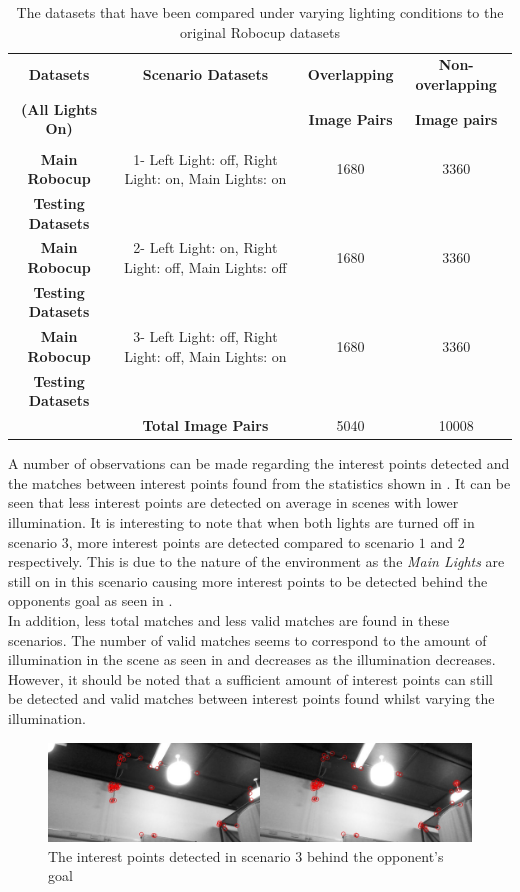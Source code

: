 \begin{table}
\centering
\caption{The datasets that have been compared under varying lighting conditions
to the original Robocup datasets}
\footnotesize
\begin{tabular}{|c|c|c|c|}
\hline 
\textbf{Datasets} & \textbf{Scenario Datasets} & \textbf{Overlapping } & \textbf{Non-overlapping }\tabularnewline
\textbf{(All Lights On)} &  & \textbf{Image Pairs} & \textbf{Image pairs}\tabularnewline
\hline 
\hline 
 &  &  & \tabularnewline
\hline 
\textbf{Main Robocup } & 1- Left Light: off, Right Light: on, Main Lights: on & 1680 & 3360\tabularnewline
\textbf{Testing Datasets} &  &  & \tabularnewline
\hline 
\textbf{Main Robocup } & 2- Left Light: on, Right Light: off, Main Lights: off & 1680 & 3360\tabularnewline
\textbf{Testing Datasets} &  &  & \tabularnewline
\hline 
\textbf{Main Robocup } & 3- Left Light: off, Right Light: off, Main Lights: on & 1680 & 3360\tabularnewline
\textbf{Testing Datasets} &  &  & \tabularnewline
\hline 
 & \textbf{Total Image Pairs} & 5040 & 10008\tabularnewline
\hline 
\end{tabular}
\label{tab:datasetLighting}
\end{table}

A number of observations can be made regarding the interest points detected and the matches between interest points found from the statistics shown in . It can be seen that less interest points are detected on average in scenes with lower illumination. It is interesting to note that when both lights are turned off in scenario $3$, more interest points are detected compared to scenario $1$ and $2$ respectively. This is due to the nature of the environment as the \textit{Main Lights} are still on in this scenario causing more interest points to be detected behind the opponents goal as seen in . \\

In addition, less total matches and less valid matches are found in these scenarios. The number of valid matches seems to correspond to the amount of illumination in the scene as seen in  and decreases as the illumination decreases. However, it should be noted that a sufficient amount of interest points can still be detected and valid matches between interest points found whilst varying the illumination.\\

\begin{figure}[h!] 
  \centering
    \includegraphics[width=1.0\textwidth]{../Drawings/Matching/dataset_lighting_incorrect_matches_OG.jpg}
    \caption{The interest points detected in scenario $3$ behind the opponent's goal}
    \label{fig:lighting_og}
\end{figure}

